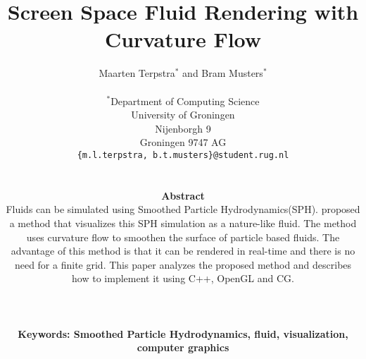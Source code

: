 \documentclass[a4paper, 10pt, twocolumn]{eguk2000}
\begin{document}

\title{Screen Space Fluid Rendering with Curvature Flow}
\author{{\sffamily Maarten Terpstra${}^\ast$ and Bram Musters${}^\ast$}\\
\\
${}^\ast$Department of Computing Science\\
University of Groningen\\
Nijenborgh 9\\
Groningen 9747 AG\\
{\tt \{m.l.terpstra, b.t.musters\}@student.rug.nl}\\
\\
\parbox{140truemm}{\normalsize
{\bfseries Abstract}\\
Fluids can be simulated using Smoothed Particle Hydrodynamics(SPH).
\cite{van2009screen} proposed a method that visualizes this SPH simulation as a nature-like fluid.
The method uses curvature flow to smoothen the surface of particle based fluids.
The advantage of this method is that it can be rendered in real-time and there is no need for a finite grid.
This paper analyzes the proposed method and describes how to implement it using C++, OpenGL and CG.
}
\\
\\
\parbox{140truemm}{\normalsize
{\bfseries Keywords: Smoothed Particle Hydrodynamics, fluid, visualization, computer graphics}
}
} %

\date{}


\maketitle 











\end{document}
